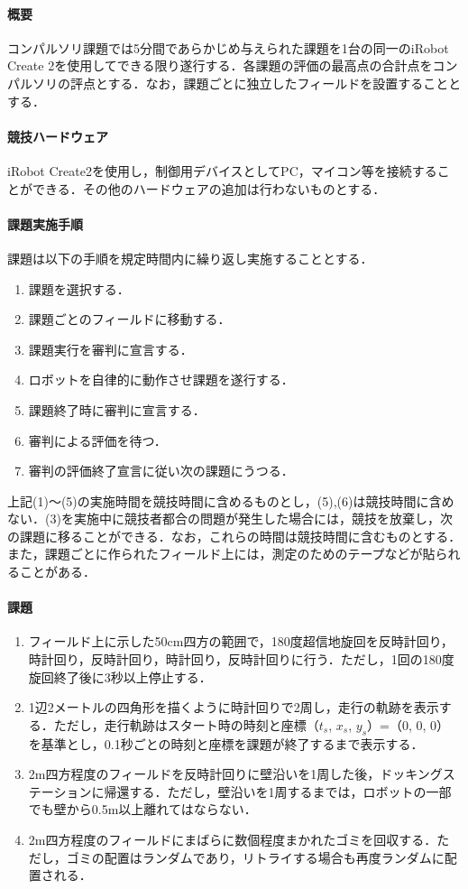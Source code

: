 \documentclass[submit]{ipsj}
\begin{document}
\paragraph*{概要}
コンパルソリ課題では5分間であらかじめ与えられた課題を1台の同一のiRobot Create 2を使用してできる限り遂行する．各課題の評価の最高点の合計点をコンパルソリの評点とする．なお，課題ごとに独立したフィールドを設置することとする．

\paragraph*{競技ハードウェア}

iRobot Create2を使用し，制御用デバイスとしてPC，マイコン等を接続することができる．その他のハードウェアの追加は行わないものとする．
\paragraph*{課題実施手順}
課題は以下の手順を規定時間内に繰り返し実施することとする．
\begin{enumerate}
\item 課題を選択する．
\item 課題ごとのフィールドに移動する．
\item 課題実行を審判に宣言する．
\item ロボットを自律的に動作させ課題を遂行する．
\item 課題終了時に審判に宣言する．
\item 審判による評価を待つ．
\item 審判の評価終了宣言に従い次の課題にうつる．
\end{enumerate}

上記(1)〜(5)の実施時間を競技時間に含めるものとし，(5),(6)は競技時間に含めない．(3)を実施中に競技者都合の問題が発生した場合には，競技を放棄し，次の課題に移ることができる．なお，これらの時間は競技時間に含むものとする．また，課題ごとに作られたフィールド上には，測定のためのテープなどが貼られることがある．

\paragraph*{課題}
\begin{enumerate}
\item フィールド上に示した50cm四方の範囲で，180度超信地旋回を反時計回り，時計回り，反時計回り，時計回り，反時計回りに行う．ただし，1回の180度旋回終了後に3秒以上停止する．
\item 1辺2メートルの四角形を描くように時計回りで2周し，走行の軌跡を表示する．ただし，走行軌跡はスタート時の時刻と座標（$t_s$, $x_s$, $y_s$）=（0, 0, 0）を基準とし，0.1秒ごとの時刻と座標を課題が終了するまで表示する．
\item 2m四方程度のフィールドを反時計回りに壁沿いを1周した後，ドッキングステーションに帰還する．ただし，壁沿いを1周するまでは，ロボットの一部でも壁から0.5m以上離れてはならない．
\item 2m四方程度のフィールドにまばらに数個程度まかれたゴミを回収する．ただし，ゴミの配置はランダムであり，リトライする場合も再度ランダムに配置される．
\end{enumerate}
\end{document}
